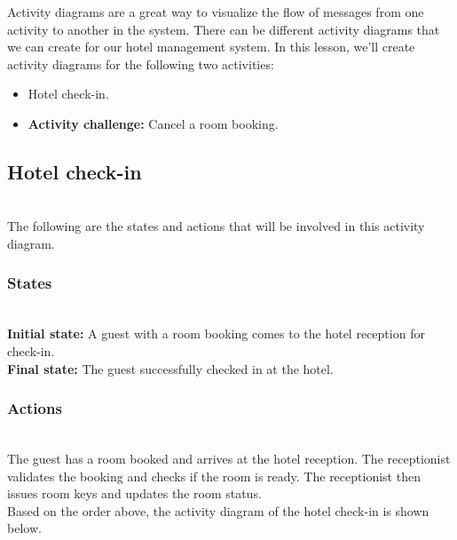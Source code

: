 

Activity diagrams are a great way to visualize the flow of messages from one activity to another in the system. There can be different activity diagrams that we can create for our hotel management system. In this lesson, we'll create activity diagrams for the following two activities:

\begin{itemize}
\item
Hotel check-in.
\item
\protect{}\label{W4I4BIl9OXo7RD9stG031}
\textbf{Activity challenge:} Cancel a room booking.
\end{itemize}

\subsection{Hotel check-in}\label{1Qeh6MmnmxRP_V7T4N2ZX}
\\
The following are the states and actions that will be involved in this activity diagram.

\subsubsection{States}\label{CmmoUnhDriE9e1itk3xtG}
\\
\textbf{Initial state:} A guest with a room booking comes to the hotel reception for check-in.
\\
\textbf{Final state:} The guest successfully checked in at the hotel.

\subsubsection{Actions}\label{f1AYd-gReLGKfP8JNSyQR}
\\
The guest has a room booked and arrives at the hotel reception. The receptionist validates the booking and checks if the room is ready. The receptionist then issues room keys and updates the room status.
\\
Based on the order above, the activity diagram of the hotel check-in is shown below.

